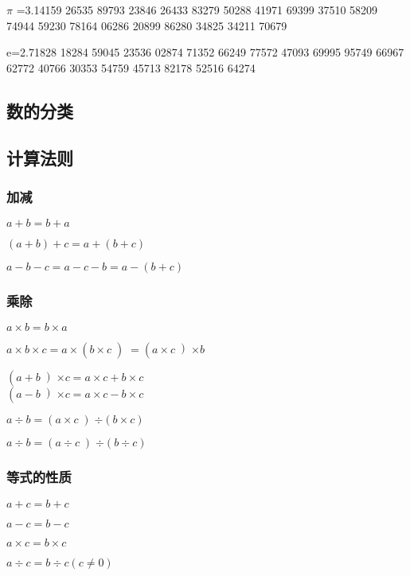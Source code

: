 \documentclass[UTF8]{ctexart}
\begin{document}
$\pi$ =3.14159 26535 89793 23846 26433 
83279 50288 41971 69399 37510 
58209 74944 59230 78164 06286 
20899 86280 34825 34211 70679 

e=2.71828 18284 59045 23536 02874
71352 66249 77572 47093 69995 
95749 66967 62772 40766 30353 
54759 45713 82178 52516 64274 

\subsection{数的分类}

\subsection{计算法则}

\subsubsection{加减}

$a+b=b+a$ 

$(a+b)+c=a+(b+c)$

$a-b-c=a-c-b=a-(b+c)$

\subsubsection{乘除}

$a \times b=b \times a$

$a \times b \times c=a \times \left( b \times c \left) = \left( a \times c \left) \times b\right.
\right. \right. \right. $


$\left( a+b \left)  \times c=a \times c+b \times c\right. \right.$ \\

$\left( a-b \left)  \times c=a \times c-b \times c\right. \right. $

$a \div b= \left( a \times c \left)  \div  \left( b \times c \right) \right. \right. $

$a \div b= \left( a \div c \left)  \div  \left( b \div c \right) \right. \right. $

\subsubsection{等式的性质}

$a+c=b+c$

$a-c=b-c$

$a \times c=b \times c$

$a \div c=b \div c \left( c \neq 0 \right)$
\end{document}
